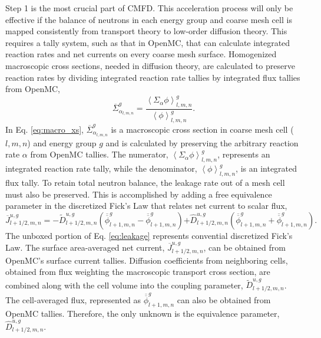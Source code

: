 \documentclass{ansconf}
\begin{document}
Step 1 is the most crucial part of CMFD. This acceleration process will only be
effective if the balance of neutrons in each energy group and coarse mesh cell
is mapped consistently from transport theory to low-order diffusion theory. This
requires a tally system, such as that in OpenMC, that can calculate integrated
reaction rates and net currents on every coarse mesh surface. Homogenized
macroscopic cross sections, needed in diffusion theory, are calculated to
preserve reaction rates by dividing integrated reaction rate tallies by
integrated flux tallies from OpenMC,
\begin{equation}
  \label{eq:macro_xs}
  \overline{\Sigma}_{\alpha_{l,m,n}}^{g} = \frac{\left\langle
    \Sigma_{\alpha}\phi \right\rangle_{l,m,n}^{g}} {\left\langle\phi
    \right\rangle_{l,m,n}^{g}}.
\end{equation}
In Eq. \ref{eq:macro_xs}, $\overline{\Sigma}_{\alpha_{l,m,n}}^{g}$ is a
macroscopic cross section in coarse mesh cell ($l,m,n$) and energy group $g$ and
is calculated by preserving the arbitrary reaction rate $\alpha$ from OpenMC
tallies. The numerator, $\left\langle\Sigma_{\alpha}\phi \right\rangle_{l,m,n}^{g}$, 
represents an integrated reaction rate tally, while the denominator, 
$\left\langle\phi\right\rangle_{l,m,n}^{g}$, is an integrated flux tally.
To retain total neutron balance, the leakage rate out of a mesh cell
must also be preserved.  This is accomplished by adding a free equivalence
parameter in the discretized Fick's Law that relates net current to scalar flux,
\begin{equation}
  \label{eq:leakage}
  \overline{J}_{l+1/2,m,n}^{u,g} = -\tilde{D}_{l+1/2,m,n}^{u,g}
  \left(\overline{\overline{\phi}}_{l+1,m,n}^{g} -
  \overline{\overline{\phi}}_{l+1,m,n}^{g} \right) \boxed{+
    \hat{D}_{l+1/2,m,n}^{u,g} \left(\overline{\overline{\phi}}_{l+1,m,n}^{g} +
    \overline{\overline{\phi}}_{l+1,m,n}^{g} \right)}.
\end{equation}
The unboxed portion of Eq. \ref{eq:leakage} represents convential discretized
Fick's Law. The surface area-averaged net current, $\overline{J}_{l+1/2,m,n}^{u,g}$,
can be obtained from OpenMC's surface current tallies. Diffusion coefficients 
from neighboring cells, obtained from flux weighting the macroscopic transport 
cross section, are combined along with the cell volume into the coupling parameter,
$\tilde{D}_{l+1/2,m,n}^{u,g}$. The cell-averaged flux, represented as 
$\overline{\overline{\phi}}_{l+1,m,n}^{g}$ can also be obtained from OpenMC tallies.
Therefore, the only unknown is the equivalence parameter, $\hat{D}_{l+1/2,m,n}^{u,g}$.
\end{document}
